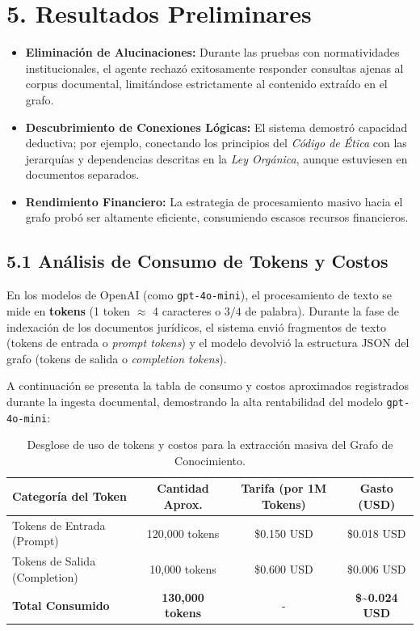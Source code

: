 \documentclass[12pt,a4paper]{article}
\begin{document}
\section*{5. Resultados Preliminares}
\begin{itemize}
    \item \textbf{Eliminación de Alucinaciones:} Durante las pruebas con normatividades institucionales, el agente rechazó exitosamente responder consultas ajenas al corpus documental, limitándose estrictamente al contenido extraído en el grafo.
    \item \textbf{Descubrimiento de Conexiones Lógicas:} El sistema demostró capacidad deductiva; por ejemplo, conectando los principios del \textit{Código de Ética} con las jerarquías y dependencias descritas en la \textit{Ley Orgánica}, aunque estuviesen en documentos separados.
    \item \textbf{Rendimiento Financiero:} La estrategia de procesamiento masivo hacia el grafo probó ser altamente eficiente, consumiendo escasos recursos financieros.
\end{itemize}

\subsection*{5.1 Análisis de Consumo de Tokens y Costos}
En los modelos de OpenAI (como \texttt{gpt-4o-mini}), el procesamiento de texto se mide en \textbf{tokens} (1 token $\approx$ 4 caracteres o $3/4$ de palabra). Durante la fase de indexación de los documentos jurídicos, el sistema envió fragmentos de texto (tokens de entrada o \textit{prompt tokens}) y el modelo devolvió la estructura JSON del grafo (tokens de salida o \textit{completion tokens}). 

A continuación se presenta la tabla de consumo y costos aproximados registrados durante la ingesta documental, demostrando la alta rentabilidad del modelo \texttt{gpt-4o-mini}:

\vspace{0.3cm}
\begin{table}[h]
    \centering
    \renewcommand{\arraystretch}{1.3}
    \begin{tabular}{|l|c|c|c|}
    \hline
    \textbf{Categoría del Token} & \textbf{Cantidad Aprox.} & \textbf{Tarifa (por 1M Tokens)} & \textbf{Gasto (USD)} \\ \hline
    Tokens de Entrada (Prompt) & 120,000 tokens & \$0.150 USD & \$0.018 USD \\ \hline
    Tokens de Salida (Completion) & 10,000 tokens & \$0.600 USD & \$0.006 USD \\ \hline
    \textbf{Total Consumido} & \textbf{130,000 tokens} & - & \textbf{\$\sim 0.024 USD} \\ \hline
    \end{tabular}
    \vspace{0.2cm}
    \caption{Desglose de uso de tokens y costos para la extracción masiva del Grafo de Conocimiento.}
\end{table}
\end{document}
